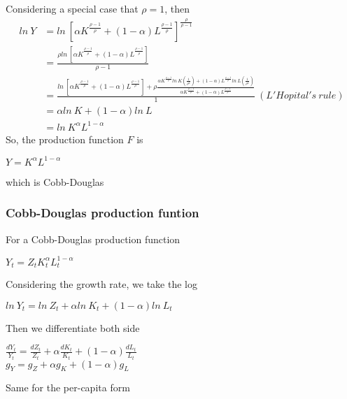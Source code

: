 \documentclass{article}
\begin{document}
Considering a special case that $\rho = 1$, then
\begin{align*}
	ln\ Y &= ln\ [\alpha K^{\frac{\rho-1}{\rho}} + (1 - \alpha) L^{\frac{\rho-1}{\rho}}]^{\frac{\rho}{\rho-1}}\\
	&= \frac{\rho ln\ [\alpha K^{\frac{\rho-1}{\rho}} + (1 - \alpha) L^{\frac{\rho-1}{\rho}}]}{\rho - 1}\\
	&= \frac{ln\ [\alpha K^{\frac{\rho-1}{\rho}} + (1 - \alpha) L^{\frac{\rho-1}{\rho}}] + \rho \frac{\alpha K^{\frac{\rho - 1}{\rho}}ln\ K(\frac{1}{\rho^2}) + (1 - \alpha)L^{\frac{\rho - 1}{\rho}}ln\ L(\frac{1}{\rho^2})}{\alpha K^{\frac{\rho-1}{\rho}} + (1 - \alpha) L^{\frac{\rho-1}{\rho}}}}{1}\ (L'Hopital's\ rule)\\
	&= \alpha ln\ K + (1 - \alpha)ln\ L\\
	&= ln\ K^\alpha L^{1-\alpha}
\end{align*}
So, the production function $F$ is\\
\centerline{$Y = K^\alpha L^{1- \alpha}$}
which is Cobb-Douglas

\subsubsection{Cobb-Douglas production funtion}
For a Cobb-Douglas production function\\
\centerline{$Y_t = Z_t K^\alpha_t L^{1-\alpha}_t$}
Considering the growth rate, we take the log\\
\centerline{$ln\ Y_t = ln\ Z_t + \alpha ln\ K_t + (1 - \alpha)ln\ L_t$}
Then we differentiate both side
\begin{center}
	$\frac{dY_t}{Y_t} = \frac{dZ_t}{Z_t} + \alpha\frac{dK_t}{K_t} + (1 - \alpha)\frac{dL_t}{L_t}$\\
	$g_Y = g_Z + \alpha g_K + (1 -\alpha)g_L$
\end{center}
Same for the per-capita form
\end{document}
